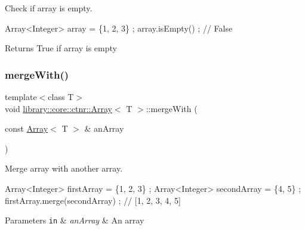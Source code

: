 Check if array is empty. 


\begin{DoxyCode}
Array<Integer> array = \{1, 2, 3\} ;
array.isEmpty() ; \textcolor{comment}{// False}
\end{DoxyCode}


\begin{DoxyReturn}{Returns}
True if array is empty 
\end{DoxyReturn}
\mbox{\label{classlibrary_1_1core_1_1ctnr_1_1Array_abe72cec38e65761df3eaddcfa9b7a44a}} 
\subsubsection{\texorpdfstring{merge\+With()}{mergeWith()}}
{\footnotesize\ttfamily template$<$class T$>$ \\
void \hyperlink{classlibrary_1_1core_1_1ctnr_1_1Array}{library\+::core\+::ctnr\+::\+Array}$<$ T $>$\+::merge\+With (\begin{DoxyParamCaption}\item[{const \hyperlink{classlibrary_1_1core_1_1ctnr_1_1Array}{Array}$<$ T $>$ \&}]{an\+Array }\end{DoxyParamCaption})}



Merge array with another array. 


\begin{DoxyCode}
Array<Integer> firstArray = \{1, 2, 3\} ;
Array<Integer> secondArray = \{4, 5\} ;
firstArray.merge(secondArray) ; \textcolor{comment}{// [1, 2, 3, 4, 5]}
\end{DoxyCode}



\begin{DoxyParams}[1]{Parameters}
\mbox{\tt in}  & {\em an\+Array} & An array \\
\hline
\end{DoxyParams}
\mbox{\label{classlibrary_1_1core_1_1ctnr_1_1Array_a5d65732e2a07b268d9def2da3c955002}} 
